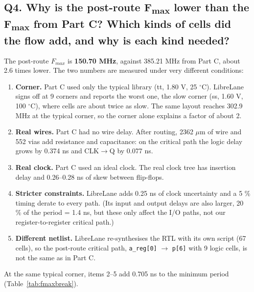 \documentclass[10pt,a4paper,twocolumn]{article}
\newcommand{\um}{$\mu$m}
\begin{document}
\subsection*{Q4. Why is the post-route F\textsubscript{max} lower than the F\textsubscript{max} from Part C? Which kinds of cells did the flow add, and why is each kind needed?}

The post-route $F_{max}$ is \textbf{150.70 MHz}, against 385.21 MHz from Part C, about 2.6 times lower. The two
numbers are measured under very different conditions:
\begin{enumerate}[nosep]
  \item \textbf{Corner.} Part C used only the typical library (tt, 1.80 V, 25 $^\circ$C). LibreLane signs off at
        9 corners and reports the worst one, the slow corner (ss, 1.60 V, 100 $^\circ$C), where cells are about
        twice as slow. The same layout reaches 302.9 MHz at the typical corner, so the corner alone explains a
        factor of about 2.
  \item \textbf{Real wires.} Part C had no wire delay. After routing, 2362 \um{} of wire and 552 vias add
        resistance and capacitance: on the critical path the logic delay grows by 0.374 ns and CLK$\rightarrow$Q
        by 0.077 ns.
  \item \textbf{Real clock.} Part C used an ideal clock. The real clock tree has insertion delay and 0.26--0.28 ns
        of skew between flip-flops.
  \item \textbf{Stricter constraints.} LibreLane adds 0.25 ns of clock uncertainty and a 5 \% timing derate to
        every path. (Its input and output delays are also larger, 20 \% of the period = 1.4 ns, but these only
        affect the I/O paths, not our register-to-register critical path.)
  \item \textbf{Different netlist.} LibreLane re-synthesises the RTL with its own script (67 cells), so the
        post-route critical path, \texttt{a\_reg[0]} $\rightarrow$ \texttt{p[6]} with 9 logic cells, is not the
        same as in Part C.
\end{enumerate}
At the same typical corner, items 2--5 add 0.705 ns to the minimum period (Table~\ref{tab:fmaxbreak}).
\end{document}
